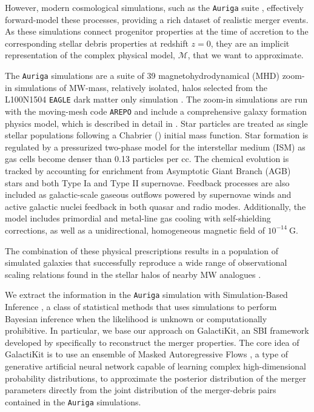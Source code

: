 However, modern cosmological simulations, such as the \texttt{Auriga} suite \citep{Grand2017,Grand2024a}, effectively forward-model these processes, providing a rich dataset of realistic merger events. As these simulations connect progenitor properties at the time of accretion to the corresponding stellar debris properties at redshift $z=0$, they are an implicit representation of the complex physical model, $\mathcal{M}$, that we want to approximate. 

The \texttt{Auriga} simulations are a suite of 39 magnetohydrodynamical (MHD) zoom-in simulations of MW-mass, relatively isolated, halos selected from the L100N1504 \texttt{EAGLE} dark matter only simulation \citep{Schaye2015}. The zoom-in simulations are run with the moving-mesh code \texttt{AREPO} \citep{Springel2010} and include a comprehensive galaxy formation physics model, which is described in detail in \cite{Grand2017}. Star particles are treated as single stellar populations following a Chabrier (\citeyear{Chabrier2003}) initial mass function. Star formation is regulated by a pressurized two-phase model for the interstellar medium (ISM) as gas cells become denser than 0.13 particles per cc. The chemical evolution is tracked by accounting for enrichment from Asymptotic Giant Branch (AGB) stars and both Type Ia and Type II supernovae. Feedback processes are also included as galactic-scale gaseous outflows powered by supernovae winds and active galactic nuclei feedback in both quasar and radio modes. Additionally, the model includes  primordial and metal-line gas cooling with self-shielding corrections, as well as a unidirectional, homogeneous magnetic field of $10^{-14}~\mathrm{G}$.

The combination of these physical prescriptions results in a population of simulated galaxies that successfully reproduce a wide range of observational scaling relations found in the stellar halos of nearby MW analogues \citep{Monachesi2019}. 

We extract the information in the \texttt{Auriga} simulation with Simulation-Based Inference \citep[SBI,][]{Cranmer2020,Ho2024}, a class of statistical methods that uses simulations to perform Bayesian inference when the likelihood is unknown or computationally prohibitive. In particular, we base our approach on GalactiKit, an SBI framework developed by \cite{Sante2025b} specifically to reconstruct the merger properties. The core idea of GalactiKit is to use an ensemble of Masked Autoregressive Flows \citep[MAFs,][]{Papamakarios2017}, a type of generative artificial neural network capable of learning complex high-dimensional probability distributions, to approximate the posterior distribution of the merger parameters directly from the joint distribution of the merger-debris pairs contained in the \texttt{Auriga} simulations.


